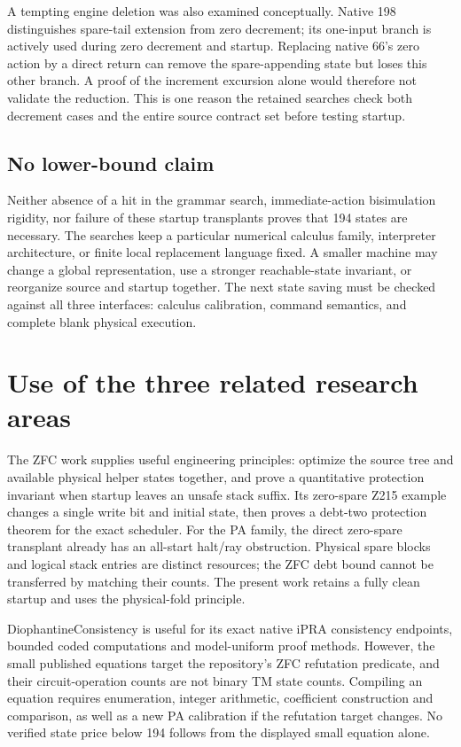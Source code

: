 \documentclass[10pt,letterpaper]{article}
\begin{document}
A tempting engine deletion was also examined conceptually.  Native
198 distinguishes spare-tail extension from zero decrement; its
one-input branch is actively used during zero decrement and startup.
Replacing native 66's zero action by a direct return can remove the
spare-appending state but loses this other branch.  A proof of the
increment excursion alone would therefore not validate the reduction.
This is one reason the retained searches check both decrement cases
and the entire source contract set before testing startup.

\subsection{No lower-bound claim}

Neither absence of a hit in the grammar search, immediate-action
bisimulation rigidity, nor failure of these startup transplants proves
that 194 states are necessary.  The searches keep a particular numerical
calculus family, interpreter architecture, or finite local replacement
language fixed.  A smaller machine may change a global representation,
use a stronger reachable-state invariant, or reorganize source and
startup together.  The next state saving must be checked against all
three interfaces: calculus calibration, command semantics, and complete
blank physical execution.

\section{Use of the three related research areas}

The ZFC work supplies useful engineering principles: optimize the
source tree and available physical helper states together, and prove
a quantitative protection invariant when startup leaves an unsafe
stack suffix.  Its zero-spare Z215 example changes a single write bit
and initial state, then proves a debt-two protection theorem for the
exact scheduler.  For the PA family, the direct zero-spare transplant
already has an all-start halt/ray obstruction.  Physical spare blocks
and logical stack entries are distinct resources; the ZFC debt bound
cannot be transferred by matching their counts.  The present work
retains a fully clean startup and uses the physical-fold principle.

DiophantineConsistency is useful for its exact native iPRA consistency
endpoints, bounded coded computations and model-uniform proof methods.
However, the small published equations target the repository's ZFC
refutation predicate, and their circuit-operation counts are not binary
TM state counts.  Compiling an equation requires enumeration,
integer arithmetic, coefficient construction and comparison, as well
as a new PA calibration if the refutation target changes.  No verified
state price below 194 follows from the displayed small equation alone.
\end{document}
